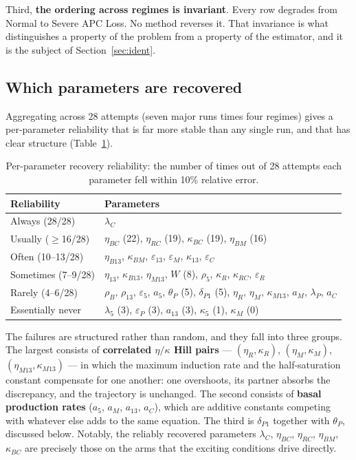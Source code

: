 \documentclass[11pt]{article}
\newcommand{\thP}{\theta_P}
\begin{document}
Third, \textbf{the ordering across regimes is invariant}. Every row degrades
from Normal to Severe APC Loss. No method reverses it. That invariance is what
distinguishes a property of the problem from a property of the estimator, and
it is the subject of Section~\ref{sec:ident}.

\subsection{Which parameters are recovered}

Aggregating across 28 attempts (seven major runs times four regimes) gives a
per-parameter reliability that is far more stable than any single run, and that
has clear structure (Table~\ref{tab:paramrecov}).

\begin{table}[H]
\centering
\small
\begin{tabular}{ll}
\toprule
\textbf{Reliability} & \textbf{Parameters} \\
\midrule
Always (28/28)      & $\lambda_C$ \\
Usually ($\ge$16/28) & $\eta_{BC}$ (22), $\eta_{RC}$ (19), $\kappa_{BC}$ (19), $\eta_{BM}$ (16) \\
Often (10--13/28)   & $\eta_{B13}$, $\kappa_{BM}$, $\varepsilon_{13}$, $\varepsilon_M$, $\kappa_{13}$, $\varepsilon_C$ \\
Sometimes (7--9/28) & $\eta_{13}$, $\kappa_{B13}$, $\eta_{M13}$, $W$ (8), $\rho_5$, $\kappa_R$, $\kappa_{RC}$, $\varepsilon_R$ \\
Rarely (4--6/28)    & $\rho_B$, $\rho_{13}$, $\varepsilon_5$, $a_5$, $\thP$ (5), $\delta_{P1}$ (5), $\eta_R$, $\eta_M$, $\kappa_{M13}$, $a_M$, $\lambda_P$, $a_C$ \\
Essentially never   & $\lambda_5$ (3), $\varepsilon_P$ (3), $a_{13}$ (3), $\kappa_5$ (1), $\kappa_M$ (0) \\
\bottomrule
\end{tabular}
\caption{Per-parameter recovery reliability: the number of times out of 28
attempts each parameter fell within 10\% relative error.}
\label{tab:paramrecov}
\end{table}

The failures are structured rather than random, and they fall into three
groups. The largest consists of \textbf{correlated $\eta/\kappa$ Hill pairs} ---
$(\eta_R, \kappa_R)$, $(\eta_M, \kappa_M)$, $(\eta_{M13}, \kappa_{M13})$ ---
in which the maximum induction rate and the half-saturation constant compensate
for one another: one overshoots, its partner absorbs the discrepancy, and the
trajectory is unchanged. The second consists of \textbf{basal production rates}
($a_5$, $a_M$, $a_{13}$, $a_C$), which are additive constants competing with
whatever else adds to the same equation. The third is $\delta_{P1}$ together
with $\thP$, discussed below. Notably, the reliably recovered parameters
$\lambda_C$, $\eta_{BC}$, $\eta_{RC}$, $\eta_{BM}$, $\kappa_{BC}$ are precisely
those on the arms that the exciting conditions drive directly.
\end{document}
